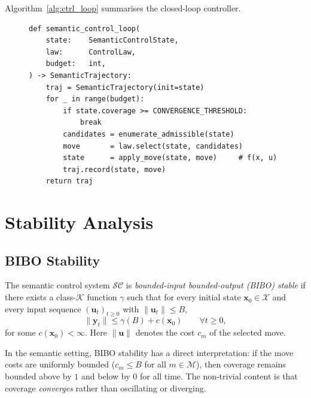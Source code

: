 \documentclass[11pt]{article}
\newcommand{\SC}{\mathcal{SC}}              %
\newcommand{\xstate}{\mathbf{x}}           %
\newcommand{\uctrl}{\mathbf{u}}            %
\newcommand{\yout}{\mathbf{y}}             %
\newcommand{\Xsp}{\mathcal{X}}            %
\newcommand{\moves}{\mathcal{M}}           %
\begin{document}
Algorithm~\ref{alg:ctrl_loop} summarises the closed-loop controller.

\begin{figure}[h]
\begin{lstlisting}[style=jugeo-python,
  caption={Semantic control loop.},
  label={alg:ctrl_loop}]
def semantic_control_loop(
    state:    SemanticControlState,
    law:      ControlLaw,
    budget:   int,
) -> SemanticTrajectory:
    traj = SemanticTrajectory(init=state)
    for _ in range(budget):
        if state.coverage >= CONVERGENCE_THRESHOLD:
            break
        candidates = enumerate_admissible(state)
        move       = law.select(state, candidates)
        state      = apply_move(state, move)     # f(x, u)
        traj.record(state, move)
    return traj
\end{lstlisting}
\end{figure}

\section{Stability Analysis}
\label{sec:stability}

\subsection{BIBO Stability}

\begin{definition}
  \label{def:bibo}
  The semantic control system $\SC$ is
  \emph{bounded-input bounded-output (BIBO) stable} if there exists a
  class-$\mathcal{K}$ function $\gamma$ such that for every initial
  state $\xstate_0 \in \Xsp$ and every input sequence
  $(\uctrl_t)_{t \geq 0}$ with $\|\uctrl_t\| \leq B$,
  \[
    \|\yout_t\| \leq \gamma(B) + c(\xstate_0)
    \qquad \forall t \geq 0,
  \]
  for some $c(\xstate_0) < \infty$.  Here $\|\uctrl\|$ denotes the
  cost $c_m$ of the selected move.
\end{definition}

\begin{remark}
  In the semantic setting, BIBO stability has a direct interpretation:
  if the move costs are uniformly bounded
  ($c_m \leq B$ for all $m \in \moves$), then coverage
  remains bounded above by $1$ and below by $0$ for all time.
  The non-trivial content is that coverage \emph{converges} rather than
  oscillating or diverging.
\end{remark}
\end{document}
